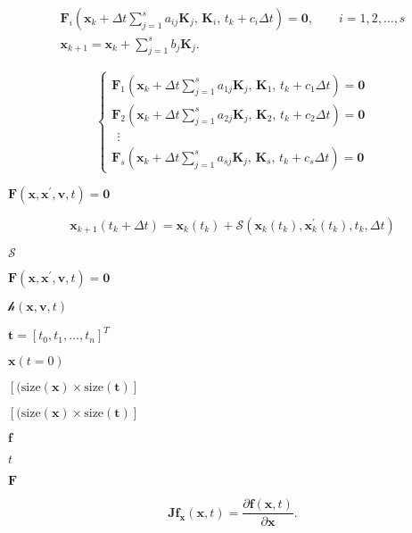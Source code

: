 \documentclass{article}
\begin{document}
\[
\begin{array}{l}
\mathbf{F}_i \left(
  \mathbf{x}_k + \Delta t \displaystyle\sum_{j=1}^s a_{ij}
    \mathbf{K}_j, \, \mathbf{K}_i, \, t_k + c_i \Delta t
\right) = \mathbf{0}, \qquad i = 1, 2, \ldots, s \\
\mathbf{x}_{k+1} = \mathbf{x}_k + \displaystyle\sum_{j=1}^s b_j \mathbf{K}_j.
\end{array}
\]
\pagebreak

\[
\left\{\begin{array}{l}
\mathbf{F}_1 \left(
  \mathbf{x}_k + \Delta t \displaystyle\sum_{j=1}^s a_{1j}
  \mathbf{K}_j, \, \mathbf{K}_1, \, t_k + c_1 \Delta t
\right) = \mathbf{0} \\
\mathbf{F}_2 \left(
  \mathbf{x}_k + \Delta t \displaystyle\sum_{j=1}^s a_{2j}
  \mathbf{K}_j, \, \mathbf{K}_2, \, t_k + c_2 \Delta t
\right) = \mathbf{0} \\
~~ \vdots \\
\mathbf{F}_s \left(
  \mathbf{x}_k + \Delta t \displaystyle\sum_{j=1}^s a_{sj}
  \mathbf{K}_j, \, \mathbf{K}_s, \, t_k + c_s \Delta t
\right) = \mathbf{0}
\end{array}\right.
\]
\pagebreak

$ \mathbf{F}(\mathbf{x}, \mathbf{x}^{\prime}, \mathbf{v}, t) = \mathbf{0}
$
\pagebreak

\[
\mathbf{x}_{k+1}(t_{k}+\Delta t) = \mathbf{x}_k(t_{k}) +
\mathcal{S}(\mathbf{x}_k(t_k), \mathbf{x}^{\prime}_k(t_k), t_k, \Delta t)
\]
\pagebreak

$ \mathcal{S} $
\pagebreak

$ \mathbf{F}(\mathbf{x}, \mathbf{x}^{\prime}, \mathbf{v}, t) = \mathbf{0} $
\pagebreak

$ \mathcal{h}(\mathbf{x}, \mathbf{v}, t) $
\pagebreak

$ \mathbf{t} = \left[ t_0, t_1, \ldots, t_n
         \right]^T $
\pagebreak

$ \mathbf{x}(t = 0) $
\pagebreak

$ \left[(\mathrm{size}(\mathbf{x}) \times \mathrm{size}
           (\mathbf{t})\right] $
\pagebreak

$ \left[(\mathrm{size}(\mathbf{x}) \times \mathrm{size}
          (\mathbf{t})\right] $
\pagebreak

$ \mathbf{f} $
\pagebreak

$ t $
\pagebreak

$ \mathbf{F} $
\pagebreak

\[
  \mathbf{Jf}_{\mathbf{x}}(\mathbf{x}, t) =
  \dfrac{\partial\mathbf{f}(\mathbf{x}, t)}{\partial\mathbf{x}} \text{.}
\]
\pagebreak
\end{document}
